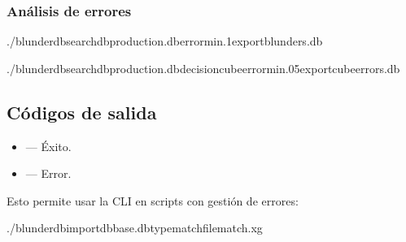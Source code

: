 \documentclass[letterpaper,10pt,spanish]{sphinxmanual}
\begin{document}
\subsubsection{Análisis de errores}
\label{\detokenize{cli:analyse-des-erreurs}}
\begin{sphinxVerbatim}[commandchars=\\\{\}]
./blunderdbsearch\PYGZhy{}\PYGZhy{}dbproduction.db\PYGZhy{}\PYGZhy{}error\PYGZhy{}min.1\PYGZhy{}\PYGZhy{}exportblunders.db

./blunderdbsearch\PYGZhy{}\PYGZhy{}dbproduction.db\PYGZhy{}\PYGZhy{}decisioncube\PYGZhy{}\PYGZhy{}error\PYGZhy{}min.05\PYGZhy{}\PYGZhy{}exportcube\PYGZus{}errors.db
\end{sphinxVerbatim}


\subsection{Códigos de salida}
\label{\detokenize{cli:codes-de-retour}}\begin{itemize}
\item {} 
\sphinxAtStartPar
{} — Éxito.

\item {} 
\sphinxAtStartPar
{} — Error.

\end{itemize}

\sphinxAtStartPar
Esto permite usar la CLI en scripts con gestión de errores:

\begin{sphinxVerbatim}[commandchars=\\\{\}]
./blunderdbimport\PYGZhy{}\PYGZhy{}dbbase.db\PYGZhy{}\PYGZhy{}typematch\PYGZhy{}\PYGZhy{}filematch.xg
\end{sphinxVerbatim}
\end{document}
